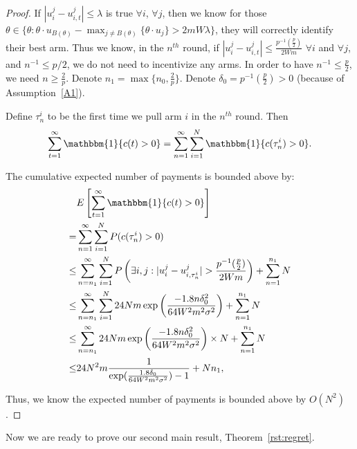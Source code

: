 \documentclass{article}
\begin{document}
\begin{proof}
If $|u_{i}^{j}-u_{i,t}^{j}|\leq \lambda$ is true $\forall i$, $\forall j$, then we know for those $\theta\in \{\theta:\theta\cdot u_{B(\theta)}-\max_{j\neq B(\theta)}\{\theta \cdot u_{j}\}> 2mW\lambda\}$, they will correctly identify their best arm. Thus we know, in the $n^{th}$ round, if $|u_{i}^{j}-u_{i,t}^{j}|\leq \frac{p^{-1}(\frac{p}{2})}{2Wm}$ $\forall i$ and $\forall j$, and $n^{-1}\leq p/2$, we do not need to incentivize any arms. In order to have $n^{-1}\leq \frac{p}{2}$, we need $n\geq \frac{2}{p}$. Denote $n_1=\max\{n_{0}, \frac{2}{p}\}$. Denote $\delta_{0}=p^{-1}(\frac{p}{2})>0$ (because of Assumption~\ref{A1}).

Define $\tau_{n}^{i}$ to be the first time we pull arm $i$ in the $n^{th}$ round. Then
\begin{align}
\sum_{t=1}^{\infty}\mathbbm{1}\{c(t)>0\} =\sum_{n=1}^{\infty}\sum_{i=1}^{N}\mathbbm{1}\{c(\tau_{n}^{i})>0\}. \nonumber
\end{align}

The cumulative expected number of payments is bounded above by:
\begin{align}
&E\left[\sum_{t=1}^{\infty}\mathbbm{1}\{c(t)>0\}\right] \nonumber \\
=&\sum_{n=1}^{\infty}\sum_{i=1}^{N}P(c(\tau_{n}^{i})>0) \nonumber \\
\leq &\sum_{n=n_{1}}^{\infty}\sum_{i=1}^{N}P\left(\exists i,j:|u_{i}^{j}-u_{i,\tau_{n}^{i}}^{j}|>\frac{p^{-1}(\frac{p}{2})}{2Wm}\right)+\sum_{n=1}^{n_1}N \nonumber \\
\leq &\sum_{n=n_{1}}^{\infty}\sum_{i=1}^{N}24Nm \exp\left(\frac{-1.8 n\delta_{0}^2}{64W^2 m^2\sigma^2}\right) +\sum_{n=1}^{n_1}N \nonumber \\
\leq & \sum_{n=n_{1}}^{\infty}24Nm \exp\left(\frac{-1.8 n\delta_{0}^2}{64W^2 m^2\sigma^2}\right)\times N+\sum_{n=1}^{n_1}N \nonumber  \\
\leq&24N^2 m \frac{1}{\exp(\frac{1.8\delta_{0}}{64W^2 m^2\sigma^2})-1} + Nn_1, \nonumber
\end{align}

Thus, we know the expected number of payments is bounded above by $O(N^2)$.

\end{proof}


Now we are ready to prove our second main result, Theorem~\ref{rst:regret}.
\end{document}
